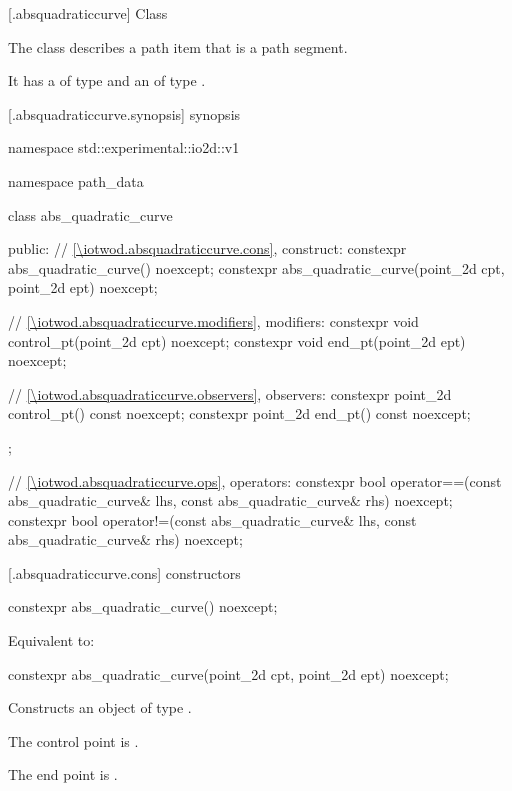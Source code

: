  [\iotwod.absquadraticcurve] {Class }

\pnum
{}%
The class  describes a path item that is a path segment.

\pnum
It has a  of type  and an  of type .

 [\iotwod.absquadraticcurve.synopsis] { synopsis}

\begin{codeblock}
namespace std::experimental::io2d::v1 {
  namespace path_data {
    class abs_quadratic_curve {
    public:
      // \ref{\iotwod.absquadraticcurve.cons}, construct:
      constexpr abs_quadratic_curve() noexcept;
      constexpr abs_quadratic_curve(point_2d cpt, point_2d ept)
        noexcept;

      // \ref{\iotwod.absquadraticcurve.modifiers}, modifiers:
      constexpr void control_pt(point_2d cpt) noexcept;
      constexpr void end_pt(point_2d ept) noexcept;

      // \ref{\iotwod.absquadraticcurve.observers}, observers:
      constexpr point_2d control_pt() const noexcept;
      constexpr point_2d end_pt() const noexcept;
    };
    
    // \ref{\iotwod.absquadraticcurve.ops}, operators:
    constexpr bool operator==(const abs_quadratic_curve& lhs,
      const abs_quadratic_curve& rhs) noexcept;
    constexpr bool operator!=(const abs_quadratic_curve& lhs,
      const abs_quadratic_curve& rhs) noexcept;
  }
}
\end{codeblock}

 [\iotwod.absquadraticcurve.cons] { constructors}

%
\begin{itemdecl}
constexpr abs_quadratic_curve() noexcept;
\end{itemdecl}
\begin{itemdescr}
\pnum
\effects
Equivalent to: 
\end{itemdescr}

%
\begin{itemdecl}
constexpr abs_quadratic_curve(point_2d cpt, point_2d ept)
  noexcept;
\end{itemdecl}
\begin{itemdescr}
\pnum
\effects
Constructs an object of type .

\pnum
The control point is .

\pnum
The end point is .
\end{itemdescr}


